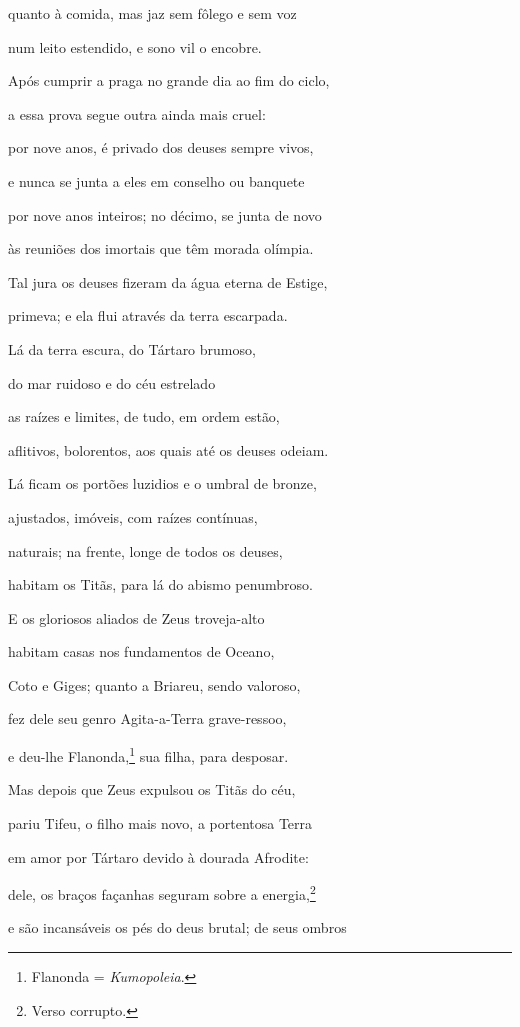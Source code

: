 \begin{pages}
\begin{Rightside}
quanto à comida, mas jaz sem fôlego e sem voz

num leito estendido, e sono vil o encobre.

Após cumprir a praga no grande dia ao fim do ciclo,

a essa prova segue outra ainda mais cruel: 

por nove anos, é privado dos deuses sempre vivos,

e nunca se junta a eles em conselho ou banquete

por nove anos inteiros; no décimo, se junta de novo

às reuniões dos imortais que têm morada olímpia.

Tal jura os deuses fizeram da água eterna de Estige, 

primeva; e ela flui através da terra escarpada.

\quad{}Lá da terra escura, do Tártaro brumoso,

do mar ruidoso e do céu estrelado

as raízes e limites, de tudo, em ordem estão,

aflitivos, bolorentos, aos quais até os deuses odeiam. 

\quad{}Lá ficam os portões luzidios e o umbral de bronze,

ajustados, imóveis, com raízes contínuas,

naturais; na frente, longe de todos os deuses,

habitam os Titãs, para lá do abismo penumbroso.

E os gloriosos aliados de Zeus troveja-alto 

habitam casas nos fundamentos de Oceano,

Coto e Giges; quanto a Briareu, sendo valoroso,

fez dele seu genro Agita-a-Terra grave-ressoo,

e deu-lhe Flanonda,\footnote{Flanonda = \emph{Kumopoleia}.} sua filha, para desposar.


Mas depois que Zeus expulsou os Titãs do céu, 

pariu Tifeu, o filho mais novo, a portentosa Terra

em amor por Tártaro devido à dourada Afrodite:

dele, os braços \dagger{}façanhas seguram sobre a energia\dagger{},\footnote{Verso corrupto.}

e são incansáveis os pés do deus brutal; de seus ombros


\end{Rightside}
\end{pages}
